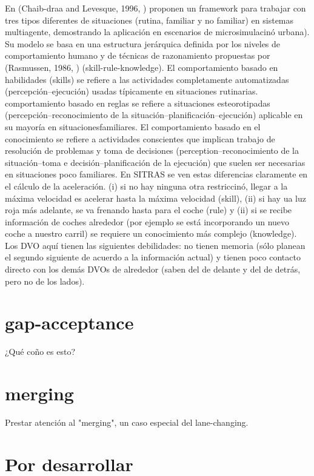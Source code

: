 En (Chaib-draa and Levesque, 1996, ) proponen un framework para trabajar con tres tipos diferentes de situaciones (rutina, familiar y no familiar) en sistemas multiagente, demostrando la aplicación en escenarios de microsimulacinó urbana). Su modelo se basa en una estructura jerárquica definida por los niveles de comportamiento humano y de técnicas de razonamiento propuestas por (Rasmussen, 1986, ) (skill-rule-knowledge). El comportamiento basado en habilidades (skills) se refiere a las actividades completamente automatizadas (percepción--ejecución) usadas típicamente en situaciones rutinarias. comportamiento basado en reglas se refiere a situaciones esteorotipadas (percepción--reconocimiento de la situación--planificación--ejecución) aplicable en su mayoría en situacionesfamiliares. El comportamiento basado en el conocimiento se refiere a actividades conscientes que implican trabajo de resolución de problemas y toma de decisiones (perception--reconocimiento de la situación--toma e decisión--planificación de la ejecución) que suelen ser necesarias en situaciones poco familiares. En SITRAS se ven estas diferencias claramente en el cálculo de la aceleración. (i) si no hay ninguna otra restriccinó, llegar a la máxima velocidad es acelerar hasta la máxima velocidad (skill), (ii) si hay ua luz roja más adelante, se va frenando hasta para el coche (rule) y (ii) si se recibe información de coches alrededor (por ejemplo se está incorporando un nuevo coche a nuestro carril) se requiere un conocimiento más complejo (knowledge). Los DVO aquí tienen las siguientes debilidades: no tienen memoria (sólo planean el segundo siguiente de acuerdo a la información actual) y tienen poco contacto directo con los demás DVOs de alrededor (saben del de delante y del de detrás, pero no de los lados).

\section{gap-acceptance}

¿Qué coño es esto?

\section{merging}

Prestar atención al "merging", un caso especial del lane-changing.

\section{Por desarrollar}


